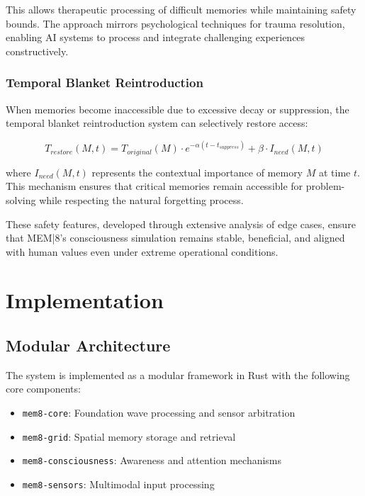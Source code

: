 \documentclass[11pt,letterpaper]{article}
\begin{document}
This allows therapeutic processing of difficult memories while maintaining safety bounds. The approach mirrors psychological techniques for trauma resolution, enabling AI systems to process and integrate challenging experiences constructively.

\subsubsection{Temporal Blanket Reintroduction}

When memories become inaccessible due to excessive decay or suppression, the temporal blanket reintroduction system can selectively restore access:

\begin{equation}
T_{restore}(M, t) = T_{original}(M) \cdot e^{-\alpha(t-t_{suppress})} + \beta \cdot I_{need}(M,t)
\end{equation}

where $I_{need}(M,t)$ represents the contextual importance of memory $M$ at time $t$. This mechanism ensures that critical memories remain accessible for problem-solving while respecting the natural forgetting process.

These safety features, developed through extensive analysis of edge cases, ensure that MEM|8's consciousness simulation remains stable, beneficial, and aligned with human values even under extreme operational conditions.

\section{Implementation}

\subsection{Modular Architecture}

The system is implemented as a modular framework in Rust with the following core components:

\begin{itemize}
\item \texttt{mem8-core}: Foundation wave processing and sensor arbitration
\item \texttt{mem8-grid}: Spatial memory storage and retrieval
\item \texttt{mem8-consciousness}: Awareness and attention mechanisms
\item \texttt{mem8-sensors}: Multimodal input processing
\end{itemize}
\end{document}
